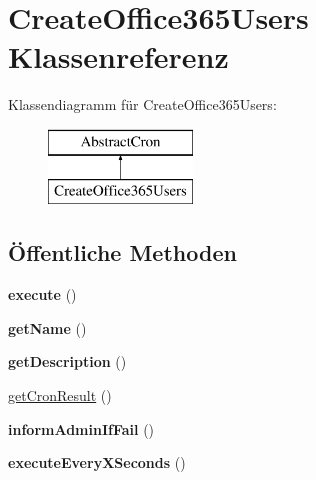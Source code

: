 \hypertarget{class_create_office365_users}{}\section{Create\+Office365\+Users Klassenreferenz}
\label{class_create_office365_users}
Klassendiagramm für Create\+Office365\+Users\+:\begin{figure}[H]
\begin{center}
\leavevmode
\includegraphics[height=2.000000cm]{class_create_office365_users}
\end{center}
\end{figure}
\subsection*{Öffentliche Methoden}
\begin{DoxyCompactItemize}
\item 
\mbox{\label{class_create_office365_users_a249a041edb306a9b5afe1edc61f21724}} 
{\bfseries execute} ()
\item 
\mbox{\label{class_create_office365_users_ac5efb63518940708a47b59a548128c5d}} 
{\bfseries get\+Name} ()
\item 
\mbox{\label{class_create_office365_users_a0be16d654f265e3e8569dd88b66a3ebf}} 
{\bfseries get\+Description} ()
\item 
\mbox{\hyperlink{class_create_office365_users_a53a7312344d7edc069ac45193cc20eb0}{get\+Cron\+Result}} ()
\item 
\mbox{\label{class_create_office365_users_ac8d66909f7192c317607b1cb01a9a765}} 
{\bfseries inform\+Admin\+If\+Fail} ()
\item 
\mbox{\label{class_create_office365_users_a8f046f6532a56fd1b3752e4113320d65}} 
{\bfseries execute\+Every\+X\+Seconds} ()
\end{DoxyCompactItemize}


